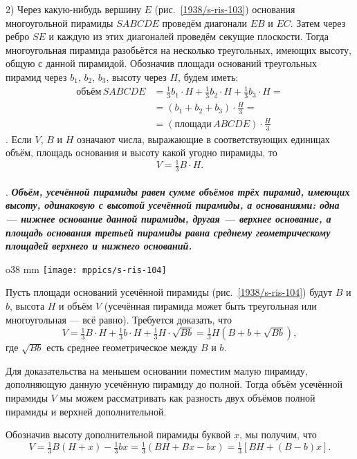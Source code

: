 2) Через какую-нибудь вершину $E$ (рис.~\ref{1938/s-ris-103}) основания многоугольной пирамиды $SABCDE$ проведём диагонали $EB$ и $EC$.
Затем через ребро $SE$ и каждую из этих диагоналей проведём секущие плоскости.
Тогда многоугольная пирамида разобьётся на несколько треугольных, имеющих высоту, общую с данной пирамидой.
Обозначив площади оснований треугольных пирамид через $b_1$, $b_2$, $b_3$, высоту через $H$, будем иметь:
\begin{align*}
\text{объём}\,SABCDE &= \tfrac13b_1\cdot H + \tfrac13b_2\cdot H + \tfrac13b_3 \cdot H =
\\
&=(b_1+b_2+b_3)\cdot \frac H3=
\\
&=(\text{площади}\,ABCDE)\cdot \frac H3
\end{align*}
.
Если $V$, $B$ и $H$ означают числа, выражающие в соответствующих единицах объём, площадь основания и высоту какой угодно пирамиды, то
\[V = \tfrac13 B\cdot H.\]

\paragraph{}\label{1938/s92}
.
\textbf{\emph{Объём, усечённой пирамиды равен сумме объёмов трёх пирамид, имеющих высоту, одинаковую с высотой усечённой пирамиды, а основаниями: одна — нижнее основание данной пирамиды, другая — верхнее основание, а площадь основания третьей пирамиды равна среднему геометрическому площадей верхнего и нижнего оснований.}}

\begin{wrapfigure}{o}{38 mm}
\vskip-0mm
\centering
\texttt{[image: mppics/s-ris-104]}
\caption{}\label{1938/s-ris-104}
\vskip-0mm
\end{wrapfigure}

Пусть площади оснований усечённой пирамиды (рис.~\ref{1938/s-ris-104}) будут $B$ и $b$, высота $H$ и объём $V$ (усечённая пирамида может быть треугольная или многоугольная — всё равно).
Требуется доказать, что
\[V = \tfrac13B\cdot H + \tfrac13 b \cdot H + \tfrac13 H\cdot \sqrt{Bb} = \tfrac13 H(B + b + \sqrt{Bb}),\]
где $\sqrt{Bb}$ есть среднее геометрическое между $B$ и $b$.

Для доказательства на меньшем основании поместим малую пирамиду, дополняющую данную усечённую пирамиду до полной.
Тогда объём усечённой пирамиды $V$ мы можем рассматривать как разность двух объёмов полной пирамиды и верхней дополнительной.

Обозначив высоту дополнительной пирамиды буквой $x$, мы получим, что
\[V = \tfrac13B(H + x)- \tfrac13bx = \tfrac13(BH + Bx-bx) = \tfrac13 [BH + (B - b)x].\]

